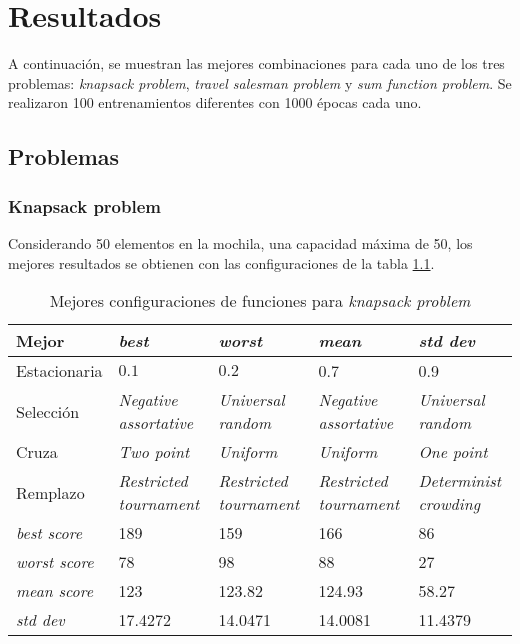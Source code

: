 \chapter{Resultados}

A continuación, se muestran las mejores combinaciones para cada uno de los tres problemas: \textit{knapsack problem}, \textit{travel salesman problem} y \textit{sum function problem}. Se realizaron 100 entrenamientos diferentes con 1000 épocas cada uno. 

\section{Problemas}

\subsection{Knapsack problem}

Considerando 50 elementos en la mochila, una capacidad máxima de 50, los mejores resultados se obtienen con las configuraciones de la tabla \ref{tab:res_ksp}.

\begin{table}[h!]
	\centering
	\begin{tabular}{|p{}|p{}|p{}|p{}|p{}|}
		\hline
		\textbf{Mejor} & \textbf{\textit{best}} & \textbf{\textit{worst}} & \textbf{\textit{mean}} & \textbf{\textit{std dev}}  \\ \hline
		Estacionaria & $0.1$ & $0.2$ & 0.7 & 0.9 \\ 
		
		Selección & \textit{Negative assortative} & \textit{Universal random} & \textit{Negative assortative} & \textit{Universal random} \\
		
		Cruza & \textit{Two point} & \textit{Uniform} &  \textit{Uniform}& \textit{One point}\\
		
		Remplazo & \textit{Restricted tournament} & \textit{Restricted tournament} & \textit{Restricted tournament} & \textit{Determinist crowding}\\ \hline
		
		\textit{best score} & 189 & 159 & 166 & 86 \\
		
		\textit{worst score} & 78  & 98 & 88 & 27\\
		
		\textit{mean score} & 123 & 123.82& 124.93& 58.27 \\
		
		\textit{std dev} & 17.4272 & 14.0471 & 14.0081 & 11.4379  \\ \hline
		
	\end{tabular}
	\caption{Mejores configuraciones de funciones para \textit{knapsack problem}}
	\label{tab:res_ksp}
\end{table}

